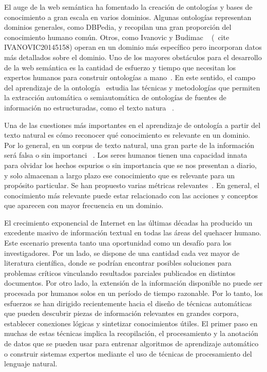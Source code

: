 El auge de la web semántica ha fomentado la creación de ontologías y bases de conocimiento a gran escala en varios dominios.
Algunas ontologías representan dominios generales, como DBPedia, y recopilan una gran proporción del conocimiento humano común.
Otros, como Ivanovic y Budimac ~ (\ cite {IVANOVIC20145158}) operan en un dominio más específico pero incorporan datos más detallados sobre el dominio.
Uno de los mayores obstáculos para el desarrollo de la web semántica es la cantidad de esfuerzo y tiempo que necesitan los expertos humanos para construir ontologías a mano~\cite{gomez2006ontological, petasis2011ontology}.
En este sentido, el campo del aprendizaje de la ontología~\cite{buitelaar2005ontology} estudia las técnicas y metodologías que permiten la extracción automática o semiautomática de ontologías de fuentes de información no estructuradas, como el texto natura ~\cite{mitchell2015never, emotinet}.

Una de las cuestiones más importantes en el aprendizaje de ontología a partir del texto natural es cómo reconocer qué conocimiento es relevante en un dominio. Por lo general, en un corpus de texto natural, una gran parte de la información será falsa o sin importanci ~\cite{Kanya2009InformationE}.
Los seres humanos tienen una capacidad innata para olvidar los hechos espurios o sin importancia que se nos presentan a diario, y solo almacenan a largo plazo ese conocimiento que es relevante para un propósito particular.
Se han propuesto varias métricas relevantes~\cite{manning2008introduction, brank2005survey}.
En general, el conocimiento más relevante puede estar relacionado con las acciones y conceptos que aparecen con mayor frecuencia en un dominio.


El crecimiento exponencial de Internet en las últimas décadas ha producido un excedente masivo de información textual en todas las áreas del quehacer humano. Este escenario presenta tanto una oportunidad como un desafío para los investigadores. Por un lado, se dispone de una cantidad cada vez mayor de literatura científica, donde se podrían encontrar posibles soluciones para problemas críticos vinculando resultados parciales publicados en distintos documentos. Por otro lado, la extensión de la información disponible no puede ser procesada por humanos solos en un período de tiempo razonable. Por lo tanto, los esfuerzos se han dirigido recientemente hacia el diseño de técnicas automáticas que pueden descubrir piezas de información relevantes en grandes corpora, establecer conexiones lógicas y sintetizar conocimientos útiles.
El primer paso en muchas de estas técnicas implica la recopilación, el procesamiento y la anotación de datos que se pueden usar para entrenar algoritmos de aprendizaje automático o construir sistemas expertos mediante el uso de técnicas de procesamiento del lenguaje natural.

